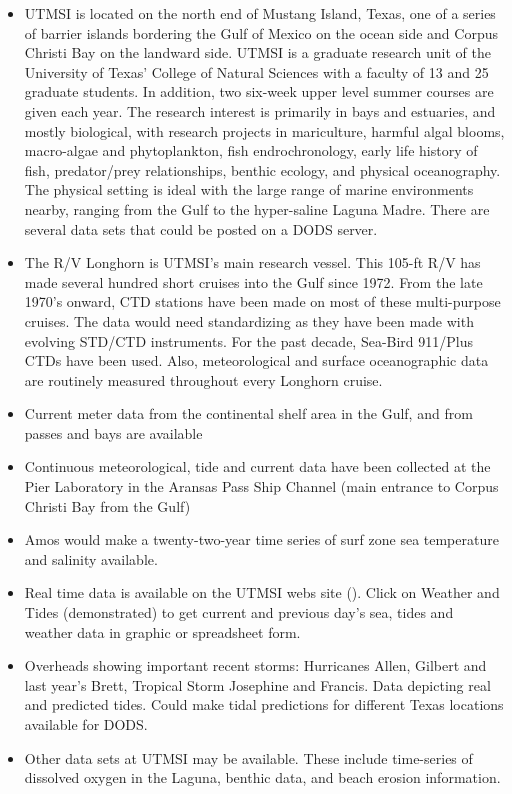 \begin{itemize}
  
\item UTMSI is located on the north end of Mustang Island, Texas, one
  of a series of barrier islands bordering the Gulf of Mexico on the
  ocean side and Corpus Christi Bay on the landward side.  UTMSI is a
  graduate research unit of the University of Texas' College of
  Natural Sciences with a faculty of 13 and 25 graduate students.  In
  addition, two six-week upper level summer courses are given each
  year.  The research interest is primarily in bays and estuaries, and
  mostly biological, with research projects in mariculture, harmful
  algal blooms, macro-algae and phytoplankton, fish endrochronology,
  early life history of fish, predator/prey relationships, benthic
  ecology, and physical oceanography.  The physical setting is ideal
  with the large range of marine environments nearby, ranging from the
  Gulf to the hyper-saline Laguna Madre.  There are several data sets
  that could be posted on a DODS server.
\item The R/V Longhorn is UTMSI's main research vessel.  This 105-ft R/V has made several 
hundred short cruises into the Gulf since 1972.  From the late 1970's onward, CTD stations 
have been made on most of these multi-purpose cruises.  The data would need standardizing 
as they have been made with evolving STD/CTD instruments.  For the past decade, Sea-Bird 
911/Plus CTDs have been used.  Also, meteorological and surface oceanographic data are 
routinely measured throughout every Longhorn cruise.
\item Current meter data from the continental shelf area in the Gulf, and from passes and bays are 
available
\item Continuous meteorological, tide and current data have been collected at the Pier Laboratory 
in the Aransas Pass Ship Channel (main entrance to Corpus Christi Bay from the Gulf)
\item Amos would make a twenty-two-year time series of surf zone sea temperature and salinity 
available.
\item Real time data is available on the UTMSI webs site ().  Click on 
Weather and Tides (demonstrated) to get current and previous day's sea, tides and weather 
data in graphic or spreadsheet form.
\item Overheads showing important recent storms: Hurricanes Allen, Gilbert and last year's Brett, 
Tropical Storm Josephine and Francis.  Data depicting real and predicted tides.  Could make 
tidal predictions for different Texas locations available for DODS.
\item Other data sets at UTMSI may be available.  These include time-series of dissolved oxygen 
in the Laguna, benthic data, and beach erosion information.
\end{itemize}

